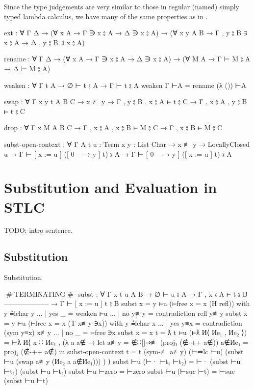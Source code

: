 \documentclass[logo,bsc,singlespacing,parskip,online]{infthesis}
\renewenvironment{code}{\mintedcopy[breaklines,breaksymbolleft=\;]{agda}}{\endmintedcopy}
\begin{document}
Since the type judgements are very similar to those in regular (named) simply typed lambda calculus,
we have many of the same properties as in \citet{wadler_programming_2022}.

\begin{code}
ext : ∀ {Γ Δ}
  → (∀ {x A}     →         Γ ∋ x ⦂ A →         Δ ∋ x ⦂ A)
  → (∀ {x y A B} → Γ , y ⦂ B ∋ x ⦂ A → Δ , y ⦂ B ∋ x ⦂ A)

rename : ∀ {Γ Δ}
  → (∀ {x A} → Γ ∋ x ⦂ A → Δ ∋ x ⦂ A)
  → (∀ {M A} → Γ ⊢ M ⦂ A → Δ ⊢ M ⦂ A)

weaken : ∀ {Γ t A}
  → ∅ ⊢ t ⦂ A
  → Γ ⊢ t ⦂ A
weaken {Γ} ⊢A = rename (λ ()) ⊢A

swap : ∀ {Γ x y t A B C}
  → x ≢ y
  → Γ , y ⦂ B , x ⦂ A ⊢ t ⦂ C
  → Γ , x ⦂ A , y ⦂ B ⊢ t ⦂ C

drop : ∀ {Γ x M A B C}
  → Γ , x ⦂ A , x ⦂ B ⊢ M ⦂ C
  → Γ , x ⦂ B ⊢ M ⦂ C

subst-open-context : ∀ {Γ A} {t u : Term} {x y : List Char}
  → x ≢ y
  → LocallyClosed u
  → Γ ⊢ [ x := u ] ([ 0 —→ y ] t) ⦂ A
  → Γ ⊢ [ 0 —→ y ] ([ x := u ] t) ⦂ A
\end{code}

\chapter{Substitution and Evaluation in STLC}
TODO: intro sentence.

\section{Substitution}
Substitution.

\begin{code}
{-# TERMINATING #-}
subst : ∀ {Γ x t u A B}
  → ∅ ⊢ u ⦂ A
  → Γ , x ⦂ A ⊢ t ⦂ B
    --------------------
  → Γ ⊢ [ x := u ] t ⦂ B
subst {x = y} ⊢u (⊢free {x = x} (H refl)) with y ≟lchar y
... | yes _   = weaken ⊢u
... | no  y≢y = contradiction refl y≢y
subst {x = y} ⊢u (⊢free {x = x} (T x≢y ∋x)) with y ≟lchar x
... | yes y≡x = contradiction (sym y≡x) x≢y
... | no  _   = ⊢free ∋x
subst {x = x} {t = ƛ t} ⊢u (⊢ƛ И⟨ Иe₁ , Иe₂ ⟩) =
  ⊢ƛ И⟨ x ∷ Иe₁
      , (λ a {a∉} →
        let a≢y   = ∉∷[]⇒≢ (proj₁ (∉-++ a∉))
            a∉Иe₁ = proj₂ (∉-++ a∉)
        in subst-open-context
          {t = t}
          (sym-≢ a≢y)
          (⊢⇒lc ⊢u)
          (subst ⊢u (swap a≢y (Иe₂ a {a∉Иe₁}))) )
      ⟩
subst ⊢u (⊢· ⊢t₁ ⊢t₂) = ⊢· (subst ⊢u ⊢t₁) (subst ⊢u ⊢t₂)
subst ⊢u ⊢zero = ⊢zero
subst ⊢u (⊢suc ⊢t) = ⊢suc (subst ⊢u ⊢t)
\end{code}
\end{document}
